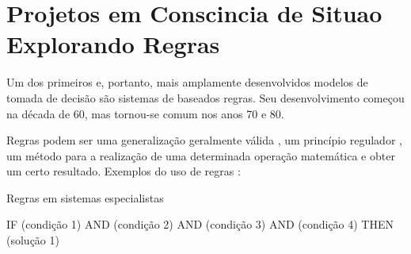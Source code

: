 \documentclass[12pt,a4paper,compsoc]{IEEEtran}
\begin{document}






\section{Projetos em Conscincia de Situao Explorando Regras}

Um dos primeiros e, portanto, mais amplamente desenvolvidos modelos de tomada de decisão são sistemas de baseados regras. Seu  desenvolvimento começou na década de 60, mas tornou-se comum nos anos 70 e 80.

Regras podem ser  uma generalização geralmente válida , um princípio regulador , um método para a realização de uma determinada  operação matemática e obter um certo resultado. Exemplos do uso de regras  :

Regras em sistemas especialistas

IF (condição 1) AND (condição 2) AND (condição 3) AND (condição 4) THEN (solução 1)
\end{document}
